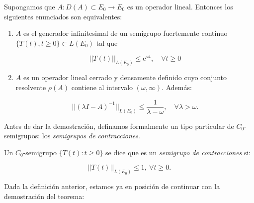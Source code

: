 \begin{Teorema}
    \label{ch:semigrupos:th:HilleYosida}
    
    Supongamos que $A : D(A) \subset E_0 \rightarrow E_0$ es un operador lineal. Entonces los siguientes enunciados son equivalentes:

    \begin{enumerate}
        \item $A$ es el generador infinitesimal de un semigrupo fuertemente continuo $\{T(t), t \geq 0\} \subset L(E_0)$ tal que

        \[||T(t)||_{L(E_0)} \leq \mathrm{e}^{\omega t}, \quad \forall t \geq 0\]

        \item $A$ es un operador lineal cerrado y densamente definido cuyo conjunto resolvente $\rho(A)$ contiene al intervalo $(\omega, \infty)$. Además:

        \[||(\lambda I - A)^{-1}||_{L(E_0)} \leq \frac{1}{\lambda - \omega}, \quad \forall \lambda > \omega.\]
    \end{enumerate}
\end{Teorema}

Antes de dar la demostración, definamos formalmente un tipo particular de $C_0$-semigrupos: los \textit{semigrupos de contracciones}.\\

\begin{Definicion}
    \label{ch:semigrupos:def:semigrupoContract}
    Un $C_0$-semigrupo $\{T(t) : t \geq 0\}$ se dice que es un \textit{semigrupo de contracciones} si:

    \[||T(t)||_{L(E_0)} \leq 1, \ \forall t \geq 0.\]
\end{Definicion}

Dada la definición anterior, estamos ya en posición de continuar con la demostración del teorema:

